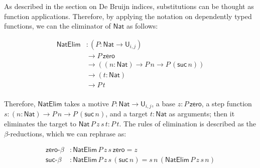 
As described in the section on De Bruijn indices, substitutions can be thought as function applications. Therefore, by applying the notation on dependently typed functions, we can the eliminator of $\mathsf{Nat}$ as follows:

$$
\begin{aligned}
    \mathsf{NatElim}&:(P:\mathsf{Nat}\to\mathsf{U}_{i,j})\\
    &\to P\,\mathsf{zero}\\
    &\to ((n:\mathsf{Nat})\to P\,n\to P\,(\mathsf{suc}\,n))\\
    &\to(t:\mathsf{Nat})\\
    &\to P\,t\\
\end{aligned}
$$

Therefore, $\mathsf{NatElim}$ takes a motive $P:\mathsf{Nat}\to\mathsf{U}_{i,j}$, a base $z:P\,\mathsf{zero}$, a step function $s:(n:\mathsf{Nat})\to P\,n\to P\,(\mathsf{suc}\,n)$, and a target $t:\mathsf{Nat}$ as arguments; then it eliminates the target to $\mathsf{Nat}\,P\,z\,s\,t:P\,t$. The rules of elimination is described as the $\beta$-reductions, which we can rephrase as:

$$
\begin{aligned}
    \textsf{zero-}\beta&:\mathsf{NatElim}\,P\,z\,s\,\mathsf{zero}=z\\
    \textsf{suc-}\beta&:\mathsf{NatElim}\,P\,z\,s\,(\mathsf{suc}\, n)=s\,n\,(\mathsf{NatElim}\,P\,z\,s\,n)\\
\end{aligned}
$$

